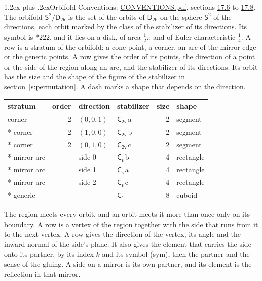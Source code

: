\documentclass[10pt,a4paper]{article}
\makeatletter
\renewcommand\section{\@startsection{section}{1}{\z@}{-3ex plus -1ex minus -.2ex}%
  {1.2ex plus .2ex}{\normalfont\large\sffamily\bfseries\color{parttitle}}}
\numberwithin{equation}{section}
\newcommand{\grp}[1]{\mathsf{#1}}
\newcommand{\orbname}[1]{#1}
\newcommand{\clsletter}[1]{\,{\scriptsize\color{black!55}#1}}
\newcommand{\dirvec}[3]{(#1, #2, #3)}
\newcommand{\twosphere}{\mathsf{S}^{2}}
\makeatother
\begin{document}
\section{Orbifold}\label{s:orbifold}
Conventions: \href{../../CONVENTIONS.pdf}{CONVENTIONS.pdf}, sections \href{../../CONVENTIONS.pdf\#conv.17.6}{17.6} to \href{../../CONVENTIONS.pdf\#conv.17.8}{17.8}.
The orbifold $\twosphere/\grp{D_{2h}}$ is the set of the orbits of $\grp{D_{2h}}$ on the sphere $\twosphere$ of the directions, each orbit marked by the class of the stabilizer of its directions. Its symbol is $\orbname{{\ast}222}$, and it lies on a disk, of area $\tfrac{1}{2}\pi$ and of Euler characteristic $\tfrac{1}{4}$.
\leavevmode\label{n:head.stratum}\label{n:head.order.point}\label{n:head.direction}\label{n:head.stabilizer}\label{n:head.size.orbit}\label{n:head.shape}A row is a stratum of the orbifold: a cone point, a corner, an arc of the mirror edge or the generic points. A row gives the order of its points, the direction of a point or the side of the region along an arc, and the stabilizer of its directions. Its orbit has the size and the shape of the figure of the stabilizer in section~\ref{s:permutation}. A dash marks a shape that depends on the direction.
{\small\setlength{\tabcolsep}{4pt}\begin{longtable}{@{}lrllrl@{}}\toprule
stratum & order & direction & stabilizer & size & shape\\\midrule\endhead
\bottomrule\endfoot\endlastfoot
corner & 2 & $\dirvec{0}{0}{1}$ & \href{C2v.pdf}{$\grp{C_{2v}}$}\clsletter{a} & 2 & segment\\*
corner & 2 & $\dirvec{1}{0}{0}$ & \href{C2v.pdf}{$\grp{C_{2v}}$}\clsletter{b} & 2 & segment\\*
corner & 2 & $\dirvec{0}{1}{0}$ & \href{C2v.pdf}{$\grp{C_{2v}}$}\clsletter{c} & 2 & segment\\*
mirror arc &  & side 0 & \href{C1v.pdf}{$\grp{C_{s}}$}\clsletter{b} & 4 & rectangle\\*
mirror arc &  & side 1 & \href{C1v.pdf}{$\grp{C_{s}}$}\clsletter{a} & 4 & rectangle\\*
mirror arc &  & side 2 & \href{C1v.pdf}{$\grp{C_{s}}$}\clsletter{c} & 4 & rectangle\\*
generic &  &  & \href{C1.pdf}{$\grp{C_{1}}$} & 8 & cuboid\\
\bottomrule\end{longtable}}
\leavevmode\label{n:head.vertex.region}\label{n:head.angle}\label{n:head.normal.side}\label{n:head.partner}\label{n:head.sense}The region meets every orbit, and an orbit meets it more than once only on its boundary. A row is a vertex of the region together with the side that runs from it to the next vertex. A row gives the direction of the vertex, its angle and the inward normal of the side's plane. It also gives the element that carries the side onto its partner, by its index $k$ and its symbol (sym), then the partner and the sense of the gluing. A side on a mirror is its own partner, and its element is the reflection in that mirror.
\end{document}
